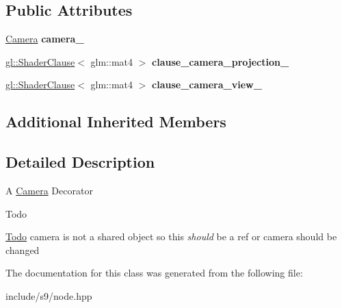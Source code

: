 \subsection*{Public Attributes}
\begin{DoxyCompactItemize}
\item 
\hypertarget{classs9_1_1NodeCamera_a9e0f65aadb3dbdf94c16c8a835972acc}{\hyperlink{classs9_1_1Camera}{Camera} {\bfseries camera\-\_\-}}\label{classs9_1_1NodeCamera_a9e0f65aadb3dbdf94c16c8a835972acc}

\item 
\hypertarget{classs9_1_1NodeCamera_a3703a291e32c8d08c77e38b74c16fb25}{\hyperlink{structs9_1_1gl_1_1ShaderClause}{gl\-::\-Shader\-Clause}$<$ glm\-::mat4 $>$ {\bfseries clause\-\_\-camera\-\_\-projection\-\_\-}}\label{classs9_1_1NodeCamera_a3703a291e32c8d08c77e38b74c16fb25}

\item 
\hypertarget{classs9_1_1NodeCamera_aa41866fc5ca7d32efd0655b8c05de76f}{\hyperlink{structs9_1_1gl_1_1ShaderClause}{gl\-::\-Shader\-Clause}$<$ glm\-::mat4 $>$ {\bfseries clause\-\_\-camera\-\_\-view\-\_\-}}\label{classs9_1_1NodeCamera_aa41866fc5ca7d32efd0655b8c05de76f}

\end{DoxyCompactItemize}
\subsection*{Additional Inherited Members}


\subsection{Detailed Description}
A \hyperlink{classs9_1_1Camera}{Camera} Decorator \begin{DoxyRefDesc}{Todo}
\item[\hyperlink{todo__todo000030}{Todo}]camera is not a shared object so this {\itshape should} be a ref or camera should be changed \end{DoxyRefDesc}


The documentation for this class was generated from the following file\-:\begin{DoxyCompactItemize}
\item 
include/s9/node.\-hpp\end{DoxyCompactItemize}
